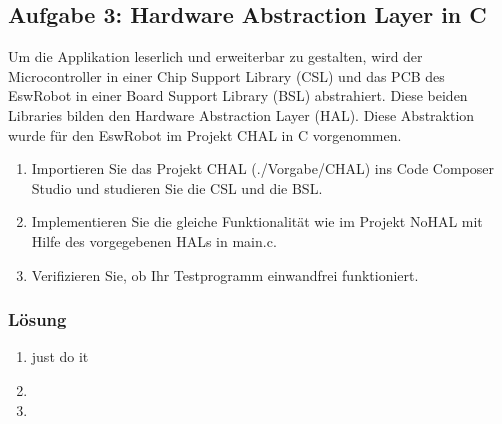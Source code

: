\subsection{Aufgabe 3: Hardware Abstraction Layer in C}

Um die Applikation leserlich und erweiterbar zu gestalten, wird der Microcontroller in einer Chip Support Library (CSL) und das PCB des EswRobot in einer Board Support Library (BSL) abstrahiert. Diese beiden Libraries bilden den Hardware Abstraction Layer (HAL). Diese Abstraktion wurde für den EswRobot im Projekt CHAL in C vorgenommen.

\begin{enumerate}
  \item Importieren Sie das Projekt CHAL (./Vorgabe/CHAL) ins Code Composer Studio und studieren Sie die CSL und die BSL.
  \item Implementieren Sie die gleiche Funktionalität wie im Projekt NoHAL mit Hilfe des vorgegebenen HALs in main.c.
  \item Verifizieren Sie, ob Ihr Testprogramm einwandfrei funktioniert.
\end{enumerate}

\subsubsection{Lösung}
\begin{enumerate}
  \item just do it
  \item 
  \item 
  \noindent\makebox[\linewidth]{\rule{\paperwidth}{0.4pt}}
  
  \noindent\makebox[\linewidth]{\rule{\paperwidth}{0.4pt}}
  
  \noindent\makebox[\linewidth]{\rule{\paperwidth}{0.4pt}}
  
  \noindent\makebox[\linewidth]{\rule{\paperwidth}{0.4pt}}
  
  \noindent\makebox[\linewidth]{\rule{\paperwidth}{0.4pt}}
  
  \noindent\makebox[\linewidth]{\rule{\paperwidth}{0.4pt}}
  
  \noindent\makebox[\linewidth]{\rule{\paperwidth}{0.4pt}}
  
  \noindent\makebox[\linewidth]{\rule{\paperwidth}{0.4pt}}
  
  \noindent\makebox[\linewidth]{\rule{\paperwidth}{0.4pt}}

\end{enumerate}

